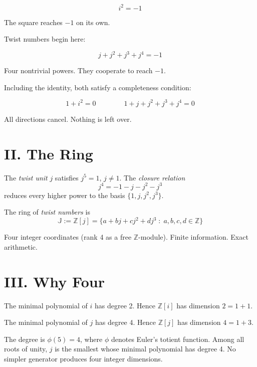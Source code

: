 \documentclass[11pt, a4paper]{article}
\newcommand{\TT}{\mathbb{J}}
\begin{document}
\begin{equation*}
i^2 = -1
\end{equation*}

The square reaches $-1$ on its own.

Twist numbers begin here:

\begin{equation*}
\boxed{j + j^2 + j^3 + j^4 = -1}
\end{equation*}

Four nontrivial powers. They cooperate to reach $-1$.

Including the identity, both satisfy a completeness condition:

\begin{equation*}
1 + i^2 = 0 \qquad\qquad 1 + j + j^2 + j^3 + j^4 = 0
\end{equation*}

All directions cancel. Nothing is left over.

\section*{II. The Ring}

The \textit{twist unit} $j$ satisfies $j^5 = 1$, $j \neq 1$. The \textit{closure relation}
\begin{equation*}
j^4 = -1 - j - j^2 - j^3
\end{equation*}
reduces every higher power to the basis $\{1, j, j^2, j^3\}$.

The ring of \textit{twist numbers} is
\begin{equation*}
\TT := \mathbb{Z}[j] = \{a + bj + cj^2 + dj^3 \;:\; a, b, c, d \in \mathbb{Z}\}
\end{equation*}

Four integer coordinates (rank 4 as a free $\mathbb{Z}$-module). Finite information. Exact arithmetic.

\section*{III. Why Four}

The minimal polynomial of $i$ has degree 2. Hence $\mathbb{Z}[i]$ has dimension $2 = 1 + 1$.

The minimal polynomial of $j$ has degree 4. Hence $\mathbb{Z}[j]$ has dimension $4 = 1 + 3$.

The degree is $\phi(5) = 4$, where $\phi$ denotes Euler's totient function. Among all roots of unity, $j$ is the smallest whose minimal polynomial has degree 4. No simpler generator produces four integer dimensions.
\end{document}
